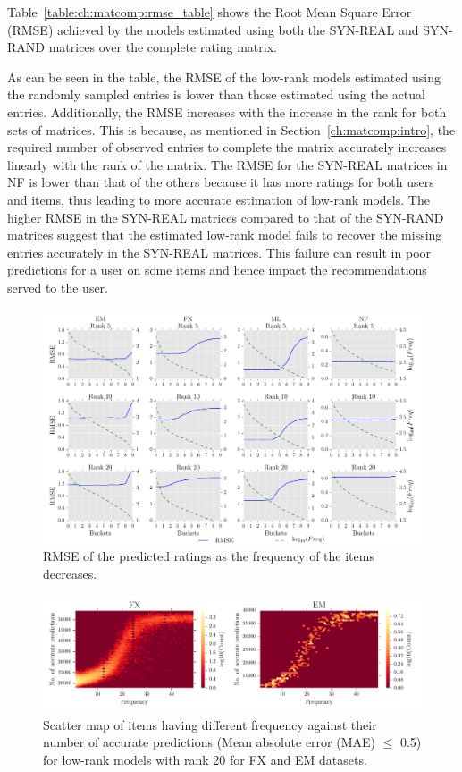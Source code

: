 Table~\ref{table:ch:matcomp:rmse_table} shows the Root Mean Square Error (RMSE) achieved by
the models estimated using both the SYN-REAL and SYN-RAND matrices over the
complete rating matrix.


As can be seen in the table, the RMSE of the low-rank models estimated using the
randomly sampled entries is lower than those estimated using the actual entries.
Additionally, the RMSE increases with the increase in the rank for both sets of
matrices. This is because, as mentioned in Section~\ref{ch:matcomp:intro}, the required number of observed entries to complete
the matrix accurately increases linearly with the rank of the
matrix. 
The RMSE for the SYN-REAL matrices in NF is lower than that of the
others because it has more ratings for both users and items, thus leading to
more accurate estimation of low-rank models.
The higher RMSE in the SYN-REAL matrices compared to that of the SYN-RAND
matrices suggest that the estimated low-rank model fails to recover the missing entries
accurately in the SYN-REAL matrices. This failure can result in
poor predictions for a user on some items and hence impact the recommendations
served to the user.

\begin{figure}[ht]
  \includegraphics[scale=0.49]{figures/freq_rmsebuckets}
  \caption{RMSE of the predicted ratings as the frequency of the items decreases.}
  \label{fig:freqRMSEbuck}
\end{figure}

\begin{figure}[hbt]
  \includegraphics[scale=0.59]{figures/FX_EM_Freq_Accu_count.pdf} 
  \caption{Scatter map of items having different frequency against their number of
  accurate predictions (Mean absolute error (MAE) $\le$ 0.5) for low-rank
models with rank 20 for FX and EM datasets.}
  \label{fig:freq_accu}
\end{figure}

